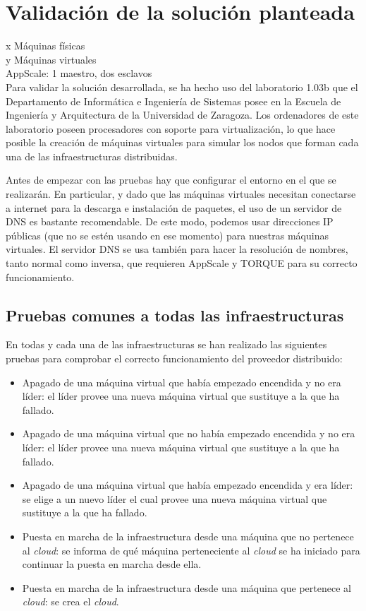 \chapter{Validación de la solución planteada}
\label{cap:validacion}

x Máquinas físicas\\
y Máquinas virtuales\\
AppScale: 1 maestro, dos esclavos\\


Para validar la solución desarrollada, se ha hecho uso del laboratorio 1.03b que el Departamento de Informática e Ingeniería de Sistemas posee en la Escuela de Ingeniería y Arquitectura de la Universidad de Zaragoza. Los ordenadores de este laboratorio poseen procesadores con soporte para virtualización, lo que hace posible la creación de máquinas virtuales para simular los nodos que forman cada una de las infraestructuras distribuidas.

Antes de empezar con las pruebas hay que configurar el entorno en el que se realizarán. En particular, y dado que las máquinas virtuales necesitan conectarse a internet para la descarga e instalación de paquetes, el uso de un servidor de DNS es bastante recomendable. De este modo, podemos usar direcciones IP públicas (que no se estén usando en ese momento) para nuestras máquinas virtuales. El servidor DNS se usa también para hacer la resolución de nombres, tanto normal como inversa, que requieren AppScale y TORQUE para su correcto funcionamiento.


\section{Pruebas comunes a todas las infraestructuras}

En todas y cada una de las infraestructuras se han realizado las siguientes pruebas para comprobar el correcto funcionamiento del proveedor distribuido:

\begin{itemize}
\item Apagado de una máquina virtual que había empezado encendida y no era líder: el líder provee una nueva máquina virtual que sustituye a la que ha fallado.
\item Apagado de una máquina virtual que no había empezado encendida y no era líder: el líder provee una nueva máquina virtual que sustituye a la que ha fallado.
\item Apagado de una máquina virtual que había empezado encendida y era líder: se elige a un nuevo líder el cual provee una nueva máquina virtual que sustituye a la que ha fallado.
\item Puesta en marcha de la infraestructura desde una máquina que no pertenece al \emph{cloud}: se informa de qué máquina perteneciente al \emph{cloud} se ha iniciado para continuar la puesta en marcha desde ella.
\item Puesta en marcha de la infraestructura desde una máquina que pertenece al \emph{cloud}: se crea el \emph{cloud}.
\end{itemize}

